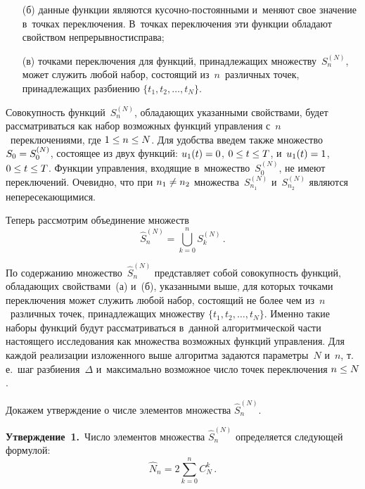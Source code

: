 \begin{multicols}{2}
\begin{itemize}
\item[(б)] данные функции являются ку\-соч\-но-по\-сто\-янными и~меняют свое значение 
в~точках переключения. В~точках переключения эти функции обладают свойством 
непрерывности\linebreak справа;

\item[(в)] точками переключения для функций, принадлежащих множеству~$S^{(N)}_n$, 
может служить любой набор, состоящий из~$n$~различных точек, принадлежащих разбиению 
$\{ t_1, t_2,\ldots, t_N  \}$.
\end{itemize}

Совокупность функций~$S^{(N)}_n$, обладающих указанными свойствами, будет 
рассматриваться как набор возможных функций управления с~$n$~переключениями, где 
$1 \hm\leq n \hm\leq N$. Для удобства введем также множество $S_0\hm=S^{(N)}_0$, 
состоящее из двух функций: $u_1(t)\hm=0$, $0 \hm\leq t \hm\leq T$, 
и~$u_1(t)\hm=1$, $0 \hm\leq t \hm\leq T$. Функции управления, входящие в~множество~$S^{(N)}_0$, 
не имеют переключений. Очевидно, что при $n_1  \hm\neq  n_2$ множества~$S^{(N)}_{n_1}$
и~$S^{(N)}_{n_2}$ являются непересекающимися.

Теперь рассмотрим объединение множеств
\begin{equation*} 
\hat S^{(N)}_n =  \bigcup\limits_{k=0}^{n} S^{(N)}_{k}\,.
\end{equation*}

По содержанию множество~$\hat S^{(N)}_n$ представляет собой совокупность функций, 
обладающих свойствами~(а) и~(б), указанными выше, для которых точками переключения 
может служить любой набор, состоящий не более чем из~$n$~различных точек, принадлежащих 
множеству $\{ t_1, t_2,\ldots, t_N  \}$. Именно такие наборы функций будут 
рассматриваться в~данной алгоритмической части настоящего исследования как 
множества возможных функций управления. Для каждой реализации изложенного выше 
алгоритма задаются параметры~$N$ и~$n$, т.\,е.\ шаг разбиения~$\Delta$ 
и~максимально возможное число точек переключения $n \hm\leq N$.

Докажем утверждение о числе элементов множества $\hat S^{(N)}_n$.

\noindent
\textbf{Утверждение~1.}\ 
Число элементов множества $\hat S^{(N)}_n$ определяется следующей формулой:
\begin{equation*} 
\hat N_n =  2 \sum \limits_{k=0}^{n} C^{k}_{N}\,.
\end{equation*}


\end{multicols}
